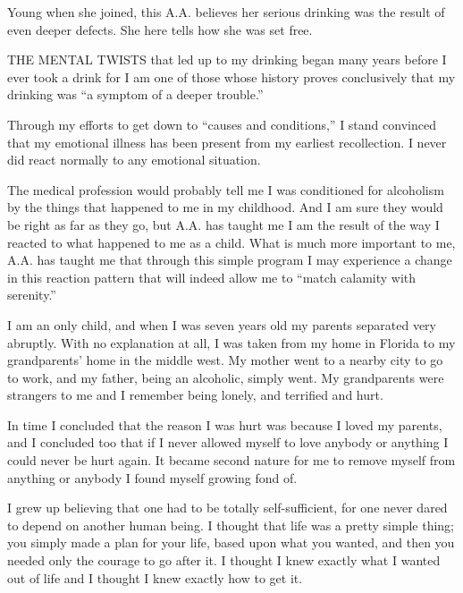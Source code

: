 

\bbChapterPreamble




\begin{biblechapter}
    Young when she joined, 
    this A.A. believes her serious drinking 
    was the result of even deeper defects.
\verse She here tells how she was set free.
\end{biblechapter}


\begin{biblechapter}
    THE MENTAL TWISTS that led up to my drinking 
    began many years before I ever took a drink 
    for I am one of those whose history proves conclusively 
    that my drinking was “a symptom of a deeper trouble.”

\verse Through my efforts to get down to “causes and conditions,” 
    I stand convinced that my emotional illness 
    has been present from my earliest recollection.
\verse I never did react normally to any emotional situation.

\verse The medical profession would probably tell me I was conditioned for alcoholism by the things that happened to me in my childhood. And I am sure they would be right as far as they go, but A.A. has taught me I am the result of the way I reacted to what happened to me as a child. What is much more important to me, A.A. has taught me that through this simple program I may experience a change in this reaction pattern that will indeed allow me to “match calamity with serenity.”

I am an only child, and when I was seven years old my parents separated very abruptly. With no explanation at all, I was taken from my home in Florida to my grandparents’ home in the middle west. My mother went to a nearby city to go to work, and my father, being an alcoholic, simply went. My grandparents were strangers to me and I remember being lonely, and terrified and hurt.

In time I concluded that the reason I was hurt was because I loved my parents, and I concluded too that if I never allowed myself to love anybody or anything I could never be hurt again. It became second nature for me to remove myself from anything or anybody I found myself growing fond of.

I grew up believing that one had to be totally self-sufficient, for one never dared to depend on another human being. I thought that life was a pretty simple thing; you simply made a plan for your life, based upon what you wanted, and then you needed only the courage to go after it. I thought I knew exactly what I wanted out of life and I thought I knew exactly how to get it.


\end{biblechapter}
